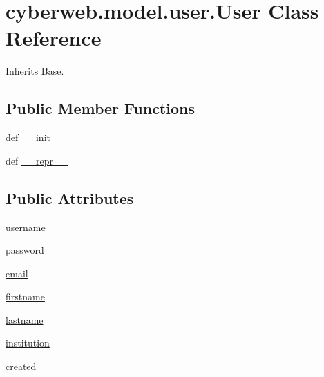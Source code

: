 \hypertarget{classcyberweb_1_1model_1_1user_1_1_user}{\section{cyberweb.\-model.\-user.\-User \-Class \-Reference}
\label{classcyberweb_1_1model_1_1user_1_1_user}
}


\-Inherits \-Base.

\subsection*{\-Public \-Member \-Functions}
\begin{DoxyCompactItemize}
\item 
def \hyperlink{classcyberweb_1_1model_1_1user_1_1_user_aa59fc686b7d8c698cd5ea47221391032}{\-\_\-\-\_\-init\-\_\-\-\_\-}
\item 
def \hyperlink{classcyberweb_1_1model_1_1user_1_1_user_af9d76d0d87720469605b548a3c3cdf1f}{\-\_\-\-\_\-repr\-\_\-\-\_\-}
\end{DoxyCompactItemize}
\subsection*{\-Public \-Attributes}
\begin{DoxyCompactItemize}
\item 
\hyperlink{classcyberweb_1_1model_1_1user_1_1_user_ae492fbd22a356b85dc04d32c907e76e6}{username}
\item 
\hyperlink{classcyberweb_1_1model_1_1user_1_1_user_af9562ca812f1b421e4bde123a26096fb}{password}
\item 
\hyperlink{classcyberweb_1_1model_1_1user_1_1_user_aa1dc0467585853fa7adaf5c54831ec7d}{email}
\item 
\hyperlink{classcyberweb_1_1model_1_1user_1_1_user_ade12e3b83ba5a9679c6720628dd4d656}{firstname}
\item 
\hyperlink{classcyberweb_1_1model_1_1user_1_1_user_aab1bcb2dff1942efcf340bc87cc2adba}{lastname}
\item 
\hyperlink{classcyberweb_1_1model_1_1user_1_1_user_a84deb8765000e97cd30e335870165da5}{institution}
\item 
\hyperlink{classcyberweb_1_1model_1_1user_1_1_user_a3d58ee4ec0da74ce772a3c83989d1ec3}{created}
\end{DoxyCompactItemize}
